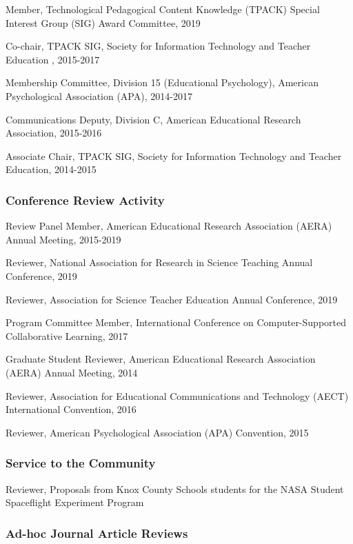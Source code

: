 \documentclass[14,]{article}
\begin{document}
Member, Technological Pedagogical Content Knowledge (TPACK) Special
Interest Group (SIG) Award Committee, 2019

Co-chair, TPACK SIG, Society for Information Technology and Teacher
Education , 2015-2017

Membership Committee, Division 15 (Educational Psychology), American
Psychological Association (APA), 2014-2017

Communications Deputy, Division C, American Educational Research
Association, 2015-2016

Associate Chair, TPACK SIG, Society for Information Technology and
Teacher Education, 2014-2015

\hypertarget{conference-review-activity}{%
\subsubsection{Conference Review
Activity}\label{conference-review-activity}}

Review Panel Member, American Educational Research Association (AERA)
Annual Meeting, 2015-2019

Reviewer, National Association for Research in Science Teaching Annual
Conference, 2019

Reviewer, Association for Science Teacher Education Annual Conference,
2019

Program Committee Member, International Conference on Computer-Supported
Collaborative Learning, 2017

Graduate Student Reviewer, American Educational Research Association
(AERA) Annual Meeting, 2014

Reviewer, Association for Educational Communications and Technology
(AECT) International Convention, 2016

Reviewer, American Psychological Association (APA) Convention, 2015

\hypertarget{service-to-the-community}{%
\subsubsection{Service to the
Community}\label{service-to-the-community}}

Reviewer, Proposals from Knox County Schools students for the NASA
Student Spaceflight Experiment Program

\hypertarget{ad-hoc-journal-article-reviews}{%
\subsubsection{Ad-hoc Journal Article
Reviews}\label{ad-hoc-journal-article-reviews}}
\end{document}
